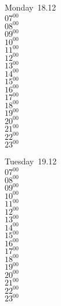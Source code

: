 \documentclass[11pt, a4paper]{book}\usepackage[]{graphicx}\usepackage[]{color}
\begin{document}
\begin{headerbox}
\end{headerbox}
\begin{weekdaybox}
  Monday~18.12\\
  { 
  \vfill
  $07^{00}$\\
$08^{00}$\\
$09^{00}$\\
$10^{00}$\\
$11^{00}$\\
$12^{00}$\\
$13^{00}$\\
$14^{00}$\\
$15^{00}$\\
$16^{00}$\\
$17^{00}$\\
$18^{00}$\\
$19^{00}$\\
$20^{00}$\\
$21^{00}$\\
$22^{00}$\\
$23^{00}$\\
  }
\end{weekdaybox}
\begin{weekdaybox}
  Tuesday~19.12\\
  { 
  \vfill
  $07^{00}$\\
$08^{00}$\\
$09^{00}$\\
$10^{00}$\\
$11^{00}$\\
$12^{00}$\\
$13^{00}$\\
$14^{00}$\\
$15^{00}$\\
$16^{00}$\\
$17^{00}$\\
$18^{00}$\\
$19^{00}$\\
$20^{00}$\\
$21^{00}$\\
$22^{00}$\\
$23^{00}$\\
  }
\end{weekdaybox}
\end{document}
